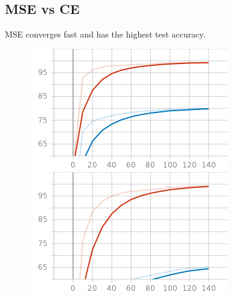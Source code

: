 \documentclass{article}
\begin{document}
\subsection{MSE vs CE}
MSE converges fast and has the highest test accuracy. 
\begin{figure}
\centering
\begin{minipage}{.5\textwidth}
  \centering
  \includegraphics[width=.9\linewidth]{result_files/accuracy_ce.png}
\end{minipage}%
\begin{minipage}{.5\textwidth}
  \centering
  \includegraphics[width=.9\linewidth]{result_files/accuracy_mse.png}

\end{minipage}
\end{figure}
\end{document}
